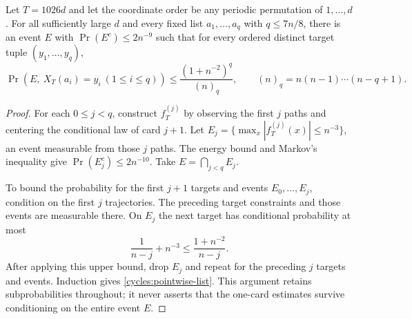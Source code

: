 \begin{lemma}
\label{cycles:list-cap}
Let $T=1026d$ and let the coordinate order be any periodic permutation
of $1,\ldots,d$. For all sufficiently large $d$ and every fixed list
$a_1,\ldots,a_q$ with $q\le7n/8$, there is an event $E$ with
$\Pr(E^c)\le2n^{-9}$ such that for every
ordered distinct target tuple $(y_1,\ldots,y_q)$,
\begin{equation}\label{cycles:pointwise-list}
 \Pr(E,\ X_T(a_i)=y_i\ (1\le i\le q))
 \le\frac{(1+n^{-2})^q}{(n)_q},
 \qquad (n)_q=n(n-1)\cdots(n-q+1).
\end{equation}
\end{lemma}
\begin{proof}
For each $0\le j<q$, construct $f_T^{(j)}$ by observing the first $j$
paths and centering the conditional law of card $j+1$.
Let $E_j=\{\max_x|f_T^{(j)}(x)|\le n^{-3}\}$, an event measurable
from those $j$ paths. The energy bound and Markov's inequality give
$\Pr(E_j^c)\le2n^{-10}$. Take $E=\bigcap_{j<q}E_j$.

To bound the probability for the first $j+1$ targets and events
$E_0,\ldots,E_j$, condition on the first $j$ trajectories. The preceding
target constraints and those events are measurable there. On $E_j$ the
next target has conditional probability at most
\[
 \frac1{n-j}+n^{-3}\le\frac{1+n^{-2}}{n-j}.
\]
After applying this upper bound, drop $E_j$ and repeat for the preceding
$ j$ targets and events. Induction gives \eqref{cycles:pointwise-list}.
This argument retains subprobabilities throughout; it never asserts
that the one-card estimates survive conditioning on the entire event $E$.
\end{proof}

